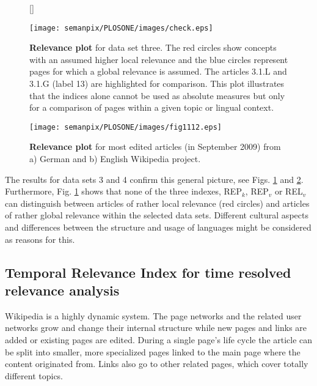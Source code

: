 \documentclass[a4paper,10pt]{scrbook}
\begin{document}
\begin{figure}[!h]
[\FBwidth]
{\caption{
{\bf Relevance plot} for data set three. The red circles show concepts with an
assumed higher local relevance and the blue circles represent pages for which a
global relevance is assumed. The articles 3.1.L and 3.1.G (label 13) are
highlighted for comparison. This plot illustrates that the indices alone cannot be used as absolute measures but only for a comparison of pages within a given topic or lingual context.}
\label{fig.REP.5}
}
{\texttt{[image: semanpix/PLOSONE/images/check.eps]}
}
\end{figure}

\begin{figure}[!ht]
\begin{center}
\texttt{[image: semanpix/PLOSONE/images/fig1112.eps]}
\end{center}
\caption{
{\bf Relevance plot} for most edited articles (in September 2009) from a)
German and b) English Wikipedia project.}
\label{fig.REP.6}
\end{figure}

The results for data sets 3 and 4 confirm this general picture, see Figs. \ref{fig.REP.5}
and \ref{fig.REP.6}. Furthermore, Fig. \ref{fig.REP.5} shows that none of the three indexes, REP$_k$, 
REP$_v$ or REL$_v$ can distinguish between articles of rather local relevance 
(red circles) and articles of rather global relevance within the selected data sets. Different cultural aspects and 
differences between the structure and usage of languages might be considered as reasons for this.  
 


\subsection{Temporal Relevance Index for time resolved relevance analysis}
\label{chap.TRI}
Wikipedia is a highly dynamic system. The page networks and the related user
networks grow and change their internal structure while new pages and links
are added or existing pages are edited. During a single page's life cycle
the article can be split into smaller, more specialized pages linked to the main
page where the content originated from. Links also go to other related pages, which cover
totally different topics.
\end{document}
